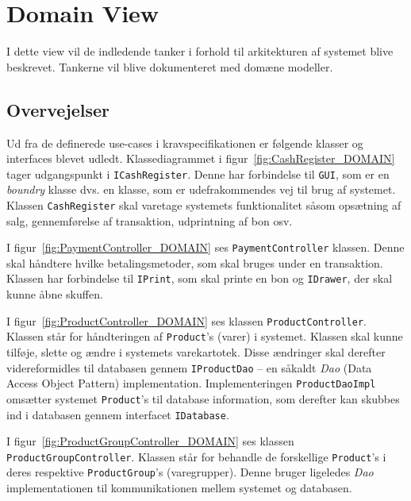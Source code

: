 \section{Domain View}
I dette view vil de indledende tanker i forhold til arkitekturen af systemet blive beskrevet. Tankerne vil blive dokumenteret med domæne modeller.

\subsection{Overvejelser}
Ud fra de definerede use-cases i kravspecifikationen er følgende klasser og interfaces blevet udledt. Klassediagrammet i figur~\ref{fig:CashRegister_DOMAIN} tager udgangspunkt i \texttt{ICashRegister}. Denne har forbindelse til \texttt{GUI}, som er en \textit{boundry} klasse dvs. en klasse, som er udefrakommendes vej til brug af systemet. Klassen \texttt{CashRegister} skal varetage systemets funktionalitet såsom opsætning af salg, gennemførelse af transaktion, udprintning af bon osv.


I figur~\ref{fig:PaymentController_DOMAIN} ses \texttt{PaymentController} klassen. Denne skal håndtere hvilke betalingsmetoder, som skal bruges under en transaktion. Klassen har forbindelse til \texttt{IPrint}, som skal printe en bon og \texttt{IDrawer}, der skal kunne åbne skuffen.

I figur~\ref{fig:ProductController_DOMAIN} ses klassen \texttt{ProductController}. Klassen står for håndteringen af \texttt{Product}'s (varer) i systemet. Klassen skal kunne tilføje, slette og ændre i systemets varekartotek. Disse ændringer skal derefter videreformidles til databasen gennem \texttt{IProductDao} -- en såkaldt \textit{Dao} (Data Access Object Pattern) implementation. Implementeringen \texttt{ProductDaoImpl} omsætter systemet \texttt{Product}'s til database information, som derefter kan skubbes ind i databasen gennem interfacet \texttt{IDatabase}.


I figur~\ref{fig:ProductGroupController_DOMAIN} ses klassen \texttt{ProductGroupController}. Klassen står for behandle de forskellige \texttt{Product}'s i deres respektive \texttt{ProductGroup}'s (varegrupper). Denne bruger ligeledes \textit{Dao} implementationen til kommunikationen mellem systemet og databasen.


